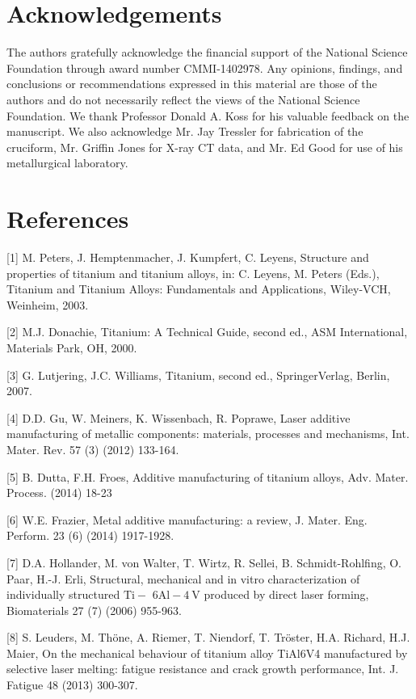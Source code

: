 \documentclass[10pt]{article}
\begin{document}
\section*{Acknowledgements}
The authors gratefully acknowledge the financial support of the National Science Foundation through award number CMMI-1402978. Any opinions, findings, and conclusions or recommendations expressed in this material are those of the authors and do not necessarily reflect the views of the National Science Foundation. We thank Professor Donald A. Koss for his valuable feedback on the manuscript. We also acknowledge Mr. Jay Tressler for fabrication of the cruciform, Mr. Griffin Jones for X-ray CT data, and Mr. Ed Good for use of his metallurgical laboratory.

\section*{References}
[1] M. Peters, J. Hemptenmacher, J. Kumpfert, C. Leyens, Structure and properties of titanium and titanium alloys, in: C. Leyens, M. Peters (Eds.), Titanium and Titanium Alloys: Fundamentals and Applications, Wiley-VCH, Weinheim, 2003.

[2] M.J. Donachie, Titanium: A Technical Guide, second ed., ASM International, Materials Park, OH, 2000.

[3] G. Lutjering, J.C. Williams, Titanium, second ed., SpringerVerlag, Berlin, 2007.

[4] D.D. Gu, W. Meiners, K. Wissenbach, R. Poprawe, Laser additive manufacturing of metallic components: materials, processes and mechanisms, Int. Mater. Rev. 57 (3) (2012) 133-164.

[5] B. Dutta, F.H. Froes, Additive manufacturing of titanium alloys, Adv. Mater. Process. (2014) 18-23

[6] W.E. Frazier, Metal additive manufacturing: a review, J. Mater. Eng. Perform. 23 (6) (2014) 1917-1928.

[7] D.A. Hollander, M. von Walter, T. Wirtz, R. Sellei, B. Schmidt-Rohlfing, O. Paar, H.-J. Erli, Structural, mechanical and in vitro characterization of individually structured $\mathrm{Ti}-$ $6 \mathrm{Al}-4 \mathrm{~V}$ produced by direct laser forming, Biomaterials 27 (7) (2006) 955-963.

[8] S. Leuders, M. Thöne, A. Riemer, T. Niendorf, T. Tröster, H.A. Richard, H.J. Maier, On the mechanical behaviour of titanium alloy TiAl6V4 manufactured by selective laser melting: fatigue resistance and crack growth performance, Int. J. Fatigue 48 (2013) 300-307.
\end{document}
